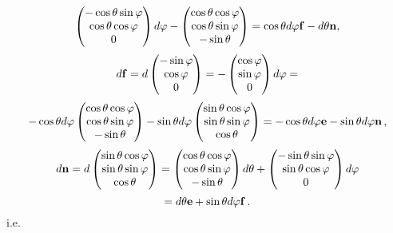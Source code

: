 \documentclass[12pt]{article}
\theoremstyle{theorem}
\numberwithin{equation}{section}
\begin{document}
           $$
\begin{pmatrix}
        -\cos\theta\sin\varphi\cr
        \cos\theta\cos\varphi\cr
           0\cr
   \end{pmatrix}d\varphi-\begin{pmatrix}
        \cos\theta\cos\varphi\cr
        \cos\theta\sin\varphi\cr
        -\sin\theta\cr
   \end{pmatrix}=\cos\theta d\varphi {\bf f}-d\theta {\bf n},
            $$
             $$
            d{\bf f}=d
            \begin{pmatrix}
        -\sin\varphi\cr
        \cos\varphi\cr
          0\cr
   \end{pmatrix}=
              -
   \begin{pmatrix}
        \cos\varphi\cr
        \sin\varphi\cr
          0\cr
   \end{pmatrix}d\varphi=
            $$
            $$
       -\cos\theta d\varphi \begin{pmatrix}
        \cos\theta\cos\varphi\cr
        \cos\theta\sin\varphi\cr
        -\sin\theta\cr
   \end{pmatrix}-\sin\theta d\varphi
   \begin{pmatrix}
    \sin\theta\cos\varphi\cr
     \sin\theta\sin\varphi\cr
      \cos\theta\cr
   \end{pmatrix}=
   -\cos\theta d\varphi {\bf e}-\sin\theta d\varphi {\bf n}\,,
            $$
             $$
             d{\bf n}=
   d\begin{pmatrix}
    \sin\theta\cos\varphi\cr
     \sin\theta\sin\varphi\cr
      \cos\theta\cr
   \end{pmatrix}=
   \begin{pmatrix}
    \cos\theta\cos\varphi\cr
     \cos\theta\sin\varphi\cr
      -\sin\theta\cr
   \end{pmatrix}d\theta+
   \begin{pmatrix}
    -\sin\theta\sin\varphi\cr
     \sin\theta\cos\varphi\cr
        0\cr
   \end{pmatrix}d\varphi
        $$
        $$
   =d\theta {\bf e}+\sin\theta d\varphi {\bf f}\,.
        $$
   i.e.
\end{document}
